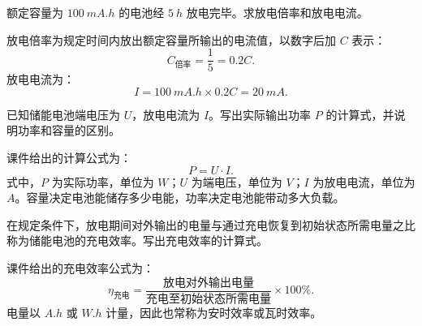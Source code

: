 \begin{problem}[额定容量与放电倍率]\label{exer:calc_03_wind_p160_01}
额定容量为 \(\qty{100}{mA.h}\) 的电池经 \(\qty{5}{h}\) 放电完毕。求放电倍率和放电电流。
\end{problem}

\begin{solution}
放电倍率为规定时间内放出额定容量所输出的电流值，以数字后加 \(C\) 表示：
\begin{equation}
C_{\text{倍率}} = \frac{1}{5} = 0.2C.
\end{equation}
放电电流为：
\begin{equation}
I = \qty{100}{mA.h} \times 0.2C = \qty{20}{mA}.
\end{equation}
\end{solution}

\begin{problem}[电池输出功率]\label{exer:calc_03_wind_p161_01}
已知储能电池端电压为 \(U\)，放电电流为 \(I\)。写出实际输出功率 \(P\) 的计算式，并说明功率和容量的区别。
\end{problem}

\begin{solution}
课件给出的计算公式为：
\begin{equation}
P = U \cdot I.
\end{equation}
式中，\(P\) 为实际功率，单位为 \(\unit{W}\)；\(U\) 为端电压，单位为 \(\unit{V}\)；\(I\) 为放电电流，单位为 \(\unit{A}\)。容量决定电池能储存多少电能，功率决定电池能带动多大负载。
\end{solution}

\begin{problem}[储能电池充电效率]\label{exer:calc_03_wind_p163_01}
在规定条件下，放电期间对外输出的电量与通过充电恢复到初始状态所需电量之比称为储能电池的充电效率。写出充电效率的计算式。
\end{problem}

\begin{solution}
课件给出的充电效率公式为：
\begin{equation}
\eta_{\text{充电}}
= \frac{\text{放电对外输出电量}}{\text{充电至初始状态所需电量}}
\times 100\%.
\end{equation}
电量以 \(\unit{A.h}\) 或 \(\unit{W.h}\) 计量，因此也常称为安时效率或瓦时效率。
\end{solution}


